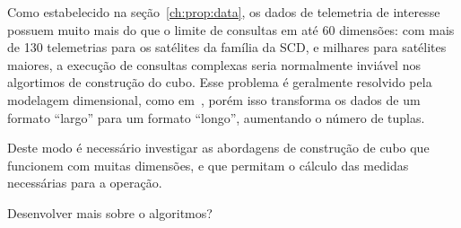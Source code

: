 {\color{red}
Como estabelecido na seção~\ref{ch:prop:data}, os dados de telemetria de interesse possuem muito mais do que o limite de consultas em até 60 dimensões: com mais de 130 telemetrias para os satélites da família da SCD, e milhares para satélites maiores, a execução de consultas complexas seria normalmente inviável nos algortimos de construção do cubo.
}
Esse problema é geralmente resolvido pela modelagem dimensional, como em~\cite{AzevedoAmbr:2010:ArSaTe}, porém isso transforma os dados de um formato ``largo'' para um formato ``longo'', aumentando o número de tuplas.

Deste modo é necessário investigar as abordagens de construção de cubo que funcionem com muitas dimensões, e que permitam o cálculo das medidas necessárias para a operação.

{\color{red} Desenvolver mais sobre o algoritmos?}

